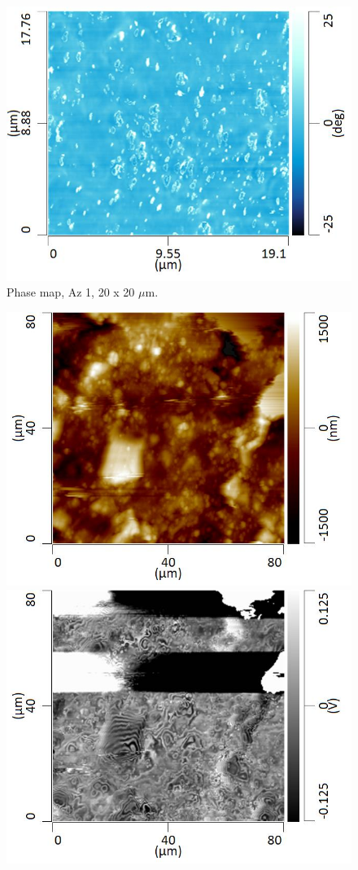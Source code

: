 \begin{figure}[H]
\centering
  \includegraphics[width=.45\textwidth]{Az1_tapping_mode_240521_phase_5}
\caption[Phase map, Az 1]{Phase map, Az 1, 20 x 20 $\mu$m.}
\label{fig:afm_az1_phase_5}
\end{figure}

\begin{figure}[H]
\centering
\begin{minipage}{.45\textwidth}
  \centering
  \includegraphics[width=\linewidth]{Az1_tapping_mode_240521_height_6}
\end{minipage}
\begin{minipage}{.45\textwidth}
  \centering
  \includegraphics[width=\linewidth]{Az1_tapping_mode_240521_def_6}

\end{minipage}
\end{figure}
